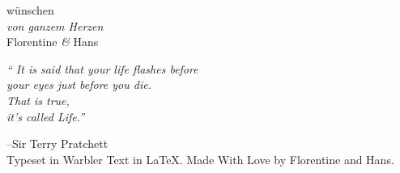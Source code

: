 \documentclass{article}
\begin{document}
\vfill

wünschen\\
\textit{von ganzem Herzen}\\
Florentine \textit{\&} Hans

\vfill\small

{\itshape``
    It is said that your life flashes before\\
    your eyes just before you die.\\
    That is true,\\
    it's called Life.''
}

--Sir Terry Pratchett
\newpage\restoregeometry %
~\\[-2\baselineskip]\vfill
{\small Typeset in Warbler Text in \LaTeX. Made With Love by Florentine and Hans.}
\end{document}
